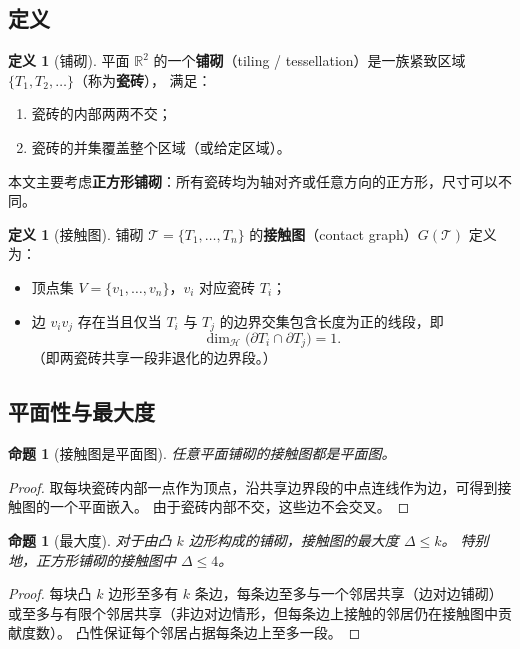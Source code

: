 \documentclass[12pt,a4paper]{article}
\theoremstyle{plain}
\newtheorem{proposition}[theorem]{命题}
\theoremstyle{definition}
\newtheorem{definition}[theorem]{定义}
\theoremstyle{remark}
\begin{document}
\subsection{定义}

\begin{definition}[铺砌]
平面 $\mathbb{R}^2$ 的一个\textbf{铺砌}（tiling / tessellation）是一族紧致区域 $\{T_1, T_2, \dots\}$（称为\textbf{瓷砖}），
满足：
\begin{enumerate}[label=(\roman*)]
    \item 瓷砖的内部两两不交；
    \item 瓷砖的并集覆盖整个区域（或给定区域）。
\end{enumerate}
本文主要考虑\textbf{正方形铺砌}：所有瓷砖均为轴对齐或任意方向的正方形，尺寸可以不同。
\end{definition}

\begin{definition}[接触图]\label{def:contact}
铺砌 $\mathcal{T} = \{T_1, \dots, T_n\}$ 的\textbf{接触图}（contact graph）$G(\mathcal{T})$ 定义为：
\begin{itemize}
    \item 顶点集 $V = \{v_1, \dots, v_n\}$，$v_i$ 对应瓷砖 $T_i$；
    \item 边 $v_i v_j$ 存在当且仅当 $T_i$ 与 $T_j$ 的边界交集包含长度为正的线段，即
    \[
    \dim_{\mathcal{H}}\big(\partial T_i \cap \partial T_j\big) = 1 .
    \]
    （即两瓷砖共享一段非退化的边界段。）
\end{itemize}
\end{definition}

\subsection{平面性与最大度}

\begin{proposition}[接触图是平面图]\label{prop:planar}
任意平面铺砌的接触图都是平面图。
\end{proposition}
\begin{proof}
取每块瓷砖内部一点作为顶点，沿共享边界段的中点连线作为边，可得到接触图的一个平面嵌入。
由于瓷砖内部不交，这些边不会交叉。
\end{proof}

\begin{proposition}[最大度]\label{prop:degree}
对于由凸 $k$ 边形构成的铺砌，接触图的最大度 $\Delta \le k$。
特别地，正方形铺砌的接触图中 $\Delta \le 4$。
\end{proposition}
\begin{proof}
每块凸 $k$ 边形至多有 $k$ 条边，每条边至多与一个邻居共享（边对边铺砌）
或至多与有限个邻居共享（非边对边情形，但每条边上接触的邻居仍在接触图中贡献度数）。
凸性保证每个邻居占据每条边上至多一段。
\end{proof}
\end{document}
